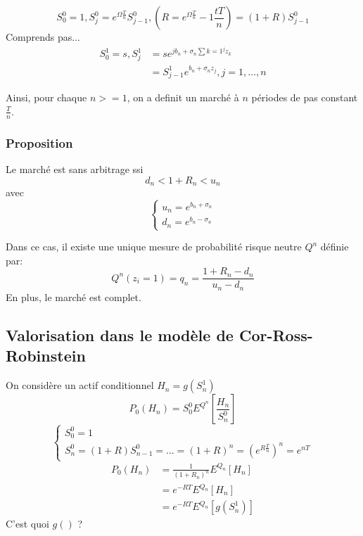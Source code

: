\documentclass{article}
\theoremstyle{plain}
\theoremstyle{definition}
\begin{document}
\begin{equation}
S_0^0=1, S_j^0=e^{\Omega\frac{T}{n}}S_{j-1}^0,(R=e^{\Omega\frac{T}{n}}-1 \frac{tT}{n})=(1+R)S_{j-1}^0
\end{equation}
{\color{red} Comprends pas...}
\begin{equation}
\begin{split}
S_0^1=s,S_j^1&=se^{jb_n+\sigma_n\sum{k=1}^j z_k}\\
&=S_{j-1}^1 e^{b_n+\sigma_n z_j}, j=1,\ldots,n
\end{split}
\end{equation}

Ainsi, pour chaque $n>=1$, on a definit un march\'e \`a $n$ p\'eriodes de pas constant $\frac{T}{n}$.

\subsubsection{Proposition}
Le march\'e est sans arbitrage ssi
\begin{equation}
d_n<1+R_n<u_n  
\end{equation}
avec
\begin{equation}
	\left\{\begin{array}{rcl}
u_n=e^{b_n+\sigma_n}\\
d_n=e^{b_n-\sigma_n}
\end{array}\right.
\end{equation}

Dans ce cas, il existe une unique mesure de probabilit\'e risque neutre $Q^n$ d\'efinie par:
\begin{equation}
Q^n(z_i=1)=q_n=\frac{1+R_n-d_n}{u_n-d_n}
\end{equation}
En plus, le march\'e est complet.
\subsection{Valorisation dans le mod\`ele de Cor-Ross-Robinstein}
On consid\`ere un actif conditionnel $H_n=g(S_n^1)$
\begin{equation}
P_0(H_n)=S_0^0E^{Q^n}[\frac{H_n}{S_n^0}]
\end{equation}
\begin{equation}
\left\{\begin{array}{l}
	S_0^0=1\\
	S_n^0=(1+R)S_{n-1}^0=\ldots=(1+R)^n=(e^{R\frac{T}{n}})^n=e^{nT}
\end{array}\right.
\end{equation}
\begin{equation}
\begin{split}
	P_0(H_n)&=\frac{1}{(1+R_n)^n}E^{Q_n}[H_n]\\
	&=e^{-R T}E^{Q_n}[H_n]\\
	&=e^{-R T}E^{Q_n}[g(S_n^1)]
\end{split}
\end{equation}
{\color{red} C'est quoi $g()$ ?}
\end{document}
